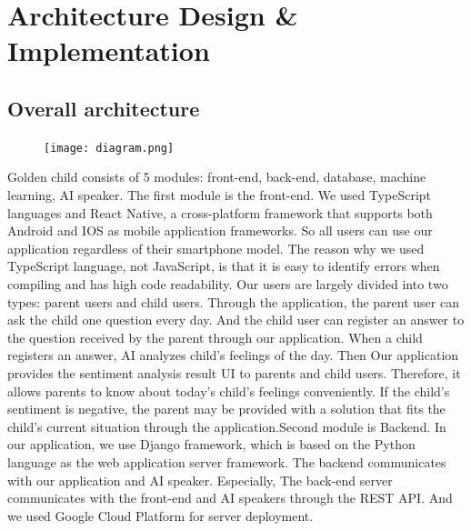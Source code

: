 \documentclass[conference]{IEEEtran}
\begin{document}
\vspace{0.5cm}
\section{\large{Architecture Design \& Implementation}}
\subsection{Overall architecture}
\begin{figure}[H]
                 \centering
                 \texttt{[image: diagram.png]}
                 \end{figure}
                
Golden child consists of 5 modules: front-end, back-end, database, machine learning, AI speaker. The first module is the front-end. We used TypeScript languages and React Native, a cross-platform framework that supports both Android and IOS as mobile application frameworks. So all users can use our application regardless of their smartphone model. The reason why we used TypeScript language, not JavaScript, is that it is easy to identify errors when compiling and has high code readability. Our users are largely divided into two types: parent users and child users. Through the application, the parent user can ask the child one question every day. And the child user can register an answer to the question received by the parent through our application. When a child registers an answer, AI analyzes child’s feelings of the day. Then Our application provides the sentiment analysis result UI to parents and child users. Therefore, it allows parents to know about today's child's feelings conveniently. If the child's sentiment is negative, the parent may be provided with a solution that fits the child's current situation through the application.Second module is Backend. In our application, we use Django framework, which is based on the Python language as the web application server framework. The backend communicates with our application and AI speaker. Especially, The back-end server communicates with the front-end and AI speakers through the REST API. And we used Google Cloud Platform for server deployment.
\end{document}

